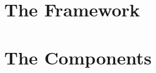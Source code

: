\documentclass[a4paper]{book}
\begin{document}


\tableofcontents

\part{The Framework}
\label{part:simulation}



\part{The Components}
\label{part:components}



\appendix{}




\printindex
\end{document}
